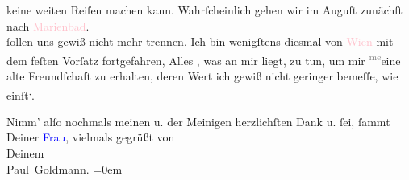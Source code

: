                keine weiten Reiſen machen kann. Wahrſcheinlich gehen wir im Auguſt zunächſt nach \textcolor{pink}{Marienbad}{}\ledrightnote{\textcolor{pink}{Marienbad}}. {\\}\label{K-03254-3v}\label{K-03254-3h} ſollen uns gewiß
               nicht mehr trennen. Ich bin wenigſtens diesmal von \textcolor{pink}{Wien}{}\ledrightnote{\textcolor{pink}{Wien}} mit dem feſten Vorſatz fortgefahren, Alles , was an mir liegt, zu tun, um mir \substVorne{}\textsuperscript{\textcolor{gray}{me}}\substDazwischen{}eine\substHinten{} alte Freundſchaft zu erhalten, deren Wert ich gewiß nicht geringer bemeſſe,
               wie einſt\substVorne{}\textsuperscript{,}\substDazwischen{}.\substHinten{}\pend
           
\pstart
           Nimm’ alſo nochmals meinen u. der Meinigen herzlichſten Dank u. ſei, ſammt
               Deiner \textcolor{blue}{Frau}{}\ledrightnote{{$\rightarrow$}\textcolor{blue}{Olga Schnitzler}}, vielmals gegrüßt
               von {\\[\baselineskip]}Deinem {\\[\baselineskip]}\spacefill\mbox{Paul Goldmann.}\pend
           \leftskip=0em{}\endnumbering{}  
      